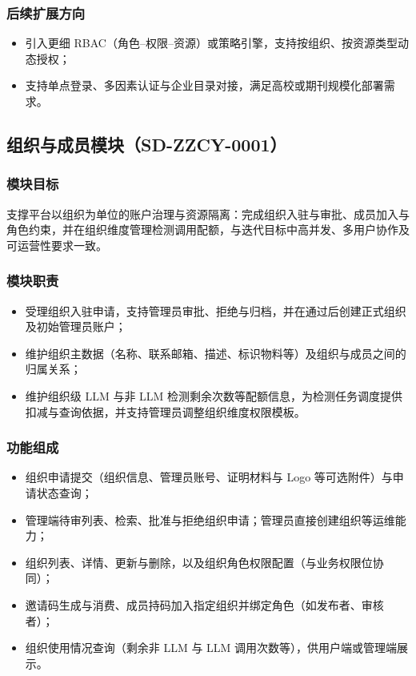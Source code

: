 \subsubsection{后续扩展方向}
\begin{itemize}[leftmargin=2em]
    \item 引入更细 RBAC（角色--权限--资源）或策略引擎，支持按组织、按资源类型动态授权；
    \item 支持单点登录、多因素认证与企业目录对接，满足高校或期刊规模化部署需求。
\end{itemize}

\subsection{组织与成员模块（SD-ZZCY-0001）}

\subsubsection{模块目标}
支撑平台以组织为单位的账户治理与资源隔离：完成组织入驻与审批、成员加入与角色约束，并在组织维度管理检测调用配额，与迭代目标中高并发、多用户协作及可运营性要求一致。

\subsubsection{模块职责}
\begin{itemize}[leftmargin=2em]
    \item 受理组织入驻申请，支持管理员审批、拒绝与归档，并在通过后创建正式组织及初始管理员账户；
    \item 维护组织主数据（名称、联系邮箱、描述、标识物料等）及组织与成员之间的归属关系；
    \item 维护组织级 LLM 与非 LLM 检测剩余次数等配额信息，为检测任务调度提供扣减与查询依据，并支持管理员调整组织维度权限模板。
\end{itemize}

\subsubsection{功能组成}
\begin{itemize}[leftmargin=2em]
    \item 组织申请提交（组织信息、管理员账号、证明材料与 Logo 等可选附件）与申请状态查询；
    \item 管理端待审列表、检索、批准与拒绝组织申请；管理员直接创建组织等运维能力；
    \item 组织列表、详情、更新与删除，以及组织角色权限配置（与业务权限位协同）；
    \item 邀请码生成与消费、成员持码加入指定组织并绑定角色（如发布者、审核者）；
    \item 组织使用情况查询（剩余非 LLM 与 LLM 调用次数等），供用户端或管理端展示。
\end{itemize}

